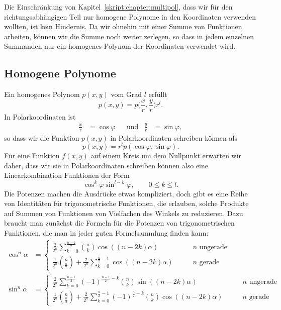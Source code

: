 Die Einschränkung von Kapitel~\ref{skript:chapter:multipol}, dass wir
für den richtungsabhängigen Teil nur homogene Poly\-nome in den Koordinaten
verwenden wollten, ist kein Hindernis.
Da wir ohnehin mit einer Summe von Funktionen arbeiten, können wir
die Summe noch weiter zerlegen, so dass in jedem einzelnen Summanden nur ein
homogenes Polynom der Koordinaten verwendet wird.

\subsection{Homogene Polynome}
Ein homogenes Polynom $p(x,y)$ vom Grad $l$ erfüllt
\[
p(x,y) = p\biggl(\frac{x}{r},\frac{y}{r}\biggr) r^l.
\]
In Polarkoordinaten ist
\[
\begin{aligned}
\frac{x}{r}&=\cos\varphi
&&\text{und}&
\frac{y}{r}&=\sin\varphi,
\end{aligned}
\]
so dass wir die Funktion $p(x,y)$ in Polarkoordinaten schreiben
können als
\[
p(x,y)=r^l p(\cos\varphi,\sin\varphi).
\]
Für eine Funktion $f(x,y)$ auf einem Kreis um dem Nullpunkt erwarten wir
daher, dass wir sie in Polarkoordinaten schreiben können also eine
Linearkombination Funktionen der Form
\begin{equation}
\cos^k\varphi \sin^{l-k}\varphi,\qquad 0\le k\le l.
\label{skript:kugelfunktionen:produkte}
\end{equation}
Die Potenzen machen die Ausdrücke etwas kompliziert, doch gibt
es eine Reihe von Identitäten für trigonometrische Funktionen,
die erlauben, solche Produkte auf Summen von Funktionen von 
Vielfachen des Winkels zu reduzieren.
Dazu braucht man zunächst die Formeln für die Potenzen von trigonometrischen
Funktionen, die man in jeder guten Formelsammlung finden kann:
\begin{align*}
\cos^n\alpha
&=
\begin{cases}
\displaystyle
\frac{2}{2^n}\sum_{k=0}^{\frac{n-1}2} \binom{n}{k}\cos((n-2k)\alpha)
&\qquad\text{$n$ ungerade}
\\[10pt]
\displaystyle
\frac{1}{2^n}\binom{n}{\frac{n}2}
+
\frac{2}{2^n}\sum_{k=0}^{\frac{n}2-1}\cos((n-2k)\alpha)
&\qquad\text{$n$ gerade}
\end{cases}
\\
\sin^n\alpha
&=
\begin{cases}
\displaystyle
\frac{2}{2^n}\sum_{k=0}^{\frac{n-1}2} (-1)^{\frac{n-1}2-k}\binom{n}{k}\sin((n-2k)\alpha)
&\qquad\text{$n$ ungerade}
\\[10pt]
\displaystyle
\frac{1}{2^n}\binom{n}{\frac{n}2}
+
\frac{2}{2^n}\sum_{k=0}^{\frac{n}2-1}(-1)^{\frac{n}2-k}\binom{n}{k}\cos((n-2k)\alpha)
&\qquad\text{$n$ gerade}
\end{cases}
\end{align*}
